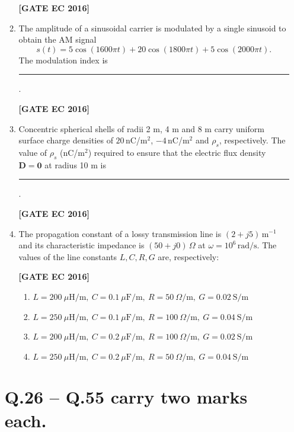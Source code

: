 \documentclass[12pt]{article}
\begin{document}
\begin{enumerate}[label=\textbf{Q.\arabic*.}, start=6, itemsep=2em]
\begin{enumerate}[label=\textbf{Q.\arabic*.}]
\noindent \textbf{[GATE EC 2016]}

\item The amplitude of a sinusoidal carrier is modulated by a single sinusoid to obtain the AM signal
\[
s(t)=5\cos(1600\pi t)+20\cos(1800\pi t)+5\cos(2000\pi t).
\]
The modulation index is \rule{2.5cm}{0.4pt}.

\noindent \textbf{[GATE EC 2016]}

\item Concentric spherical shells of radii 2 m, 4 m and 8 m carry uniform surface charge densities of $20\,$nC/m$^2$, $-4\,$nC/m$^2$ and $\rho_s$, respectively. The value of $\rho_s$ (nC/m$^2$) required to ensure that the electric flux density $\mathbf{D}=\mathbf{0}$ at radius 10 m is \rule{2.5cm}{0.4pt}.

\noindent \textbf{[GATE EC 2016]}

\item The propagation constant of a lossy transmission line is $(2+j5)\,\text{m}^{-1}$ and its characteristic impedance is $(50+j0)\,\Omega$ at $\omega=10^6\,\text{rad/s}$. The values of the line constants $L,C,R,G$ are, respectively:

\noindent \textbf{[GATE EC 2016]}

\begin{multicols}{2}
\begin{enumerate}[label=\alph*.]
    \item $L=200\ \mu\mathrm{H/m},\ C=0.1\ \mu\mathrm{F/m},\ R=50\ \Omega/\mathrm{m},\ G=0.02\ \mathrm{S/m}$
    \item $L=250\ \mu\mathrm{H/m},\ C=0.1\ \mu\mathrm{F/m},\ R=100\ \Omega/\mathrm{m},\ G=0.04\ \mathrm{S/m}$
    \item $L=200\ \mu\mathrm{H/m},\ C=0.2\ \mu\mathrm{F/m},\ R=100\ \Omega/\mathrm{m},\ G=0.02\ \mathrm{S/m}$
    \item $L=250\ \mu\mathrm{H/m},\ C=0.2\ \mu\mathrm{F/m},\ R=50\ \Omega/\mathrm{m},\ G=0.04\ \mathrm{S/m}$
\end{enumerate}
\end{multicols}

\end{enumerate}

\newpage
\section*{Q.26 -- Q.55 carry two marks each.}
\begin{enumerate}[label=\textbf{Q.\arabic*.}, start=26]


\end{enumerate}
\end{enumerate}
\end{document}

